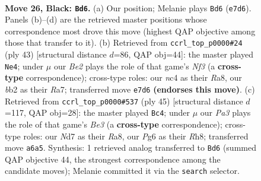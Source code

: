 \documentclass[11pt]{article}
\begin{document}
\clearpage

\begin{figure}[p]\centering
\begin{subfigure}{0.46\textwidth}\centering
\resizebox{\linewidth}{!}{%
\newchessgame
\chessboard[
  setfen={rnb5/1p1nb1k1/p3ppp1/3r3p/2N5/1P2P1P1/PBB1PK1P/R3R3 b - - 2 26},
  showmover=false,
  pgfstyle=straightmove, color=movearrow, markmove={e7-d6}
]}
\caption{}
\end{subfigure}\hfill
\begin{subfigure}{0.46\textwidth}\centering
\resizebox{\linewidth}{!}{%
\newchessgame
\chessboard[
  setfen={r2b1k2/r2n1ppp/2p1pn2/P2p4/3P1P2/1N4P1/5PBP/RR2B1K1 b - - 8 22},
  showmover=false,
  pgfstyle=straightmove, color=movearrow, markmove={f6-e4}
]}
\caption{}
\end{subfigure}
\\[4pt]
\begin{subfigure}{0.46\textwidth}\centering
\resizebox{\linewidth}{!}{%
\newchessgame
\chessboard[
  setfen={r6r/pp4p1/n1nBbkBp/4p3/3p3N/P6P/2P2PP1/4RRK1 b - - 3 23},
  showmover=false,
  pgfstyle=straightmove, color=movearrow, markmove={e6-c4}
]}
\caption{}
\end{subfigure}\hfill

\caption{\textbf{Move 26, Black: \texttt{Bd6}.} (a) Our position; Melanie plays \texttt{Bd6} (\texttt{e7d6}). Panels (b)--(d) are the retrieved master positions whose correspondence most drove this move (highest QAP objective among those that transfer to it). (b) Retrieved from \texttt{ccrl\_top\_p0000\#24} (ply 43) [structural distance $d$=86, QAP obj=44]: the master played \texttt{Ne4}; under $\mu$ our \emph{Be2} plays the role of that game's \emph{Nf3} (a \textbf{cross-type} correspondence); cross-type roles: our \emph{n}c4 as their \emph{R}a8, our \emph{b}b2 as their \emph{R}a7; transferred move \texttt{e7d6} \textbf{(endorses this move)}. (c) Retrieved from \texttt{ccrl\_top\_p0000\#537} (ply 45) [structural distance $d$=117, QAP obj=28]: the master played \texttt{Bc4}; under $\mu$ our \emph{Pa3} plays the role of that game's \emph{Be3} (a \textbf{cross-type} correspondence); cross-type roles: our \emph{N}d7 as their \emph{R}a8, our \emph{P}g6 as their \emph{R}h8; transferred move \texttt{a6a5}. Synthesis: 1 retrieved analog transferred to \texttt{Bd6} (summed QAP objective 44, the strongest correspondence among the candidate moves); Melanie committed it via the \texttt{search} selector.}
\label{fig:thought-m51}
\end{figure}
\end{document}
